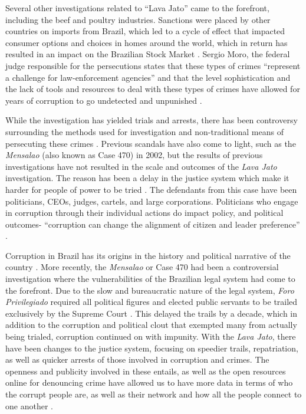 \documentclass[letterpaper, 11pt]{article}
\begin{document}
Several other investigations related to “Lava Jato” came to the forefront, including the beef and poultry industries. Sanctions were placed by other countries on imports from Brazil, which led to a cycle of effect that impacted consumer options and choices in homes around the world, which in return has resulted in an impact on the Brazilian Stock Market \citep{correa2018}. Sergio Moro, the federal judge responsible for the persecutions states that these types of crimes “represent a challenge for law-enforcement agencies” and that the level sophistication and the lack of tools and resources to deal with these types of crimes have allowed for years of corruption to go undetected and unpunished \citep{moro2018}.

While the investigation has yielded trials and arrests, there has been controversy surrounding the methods used for investigation and non-traditional means of persecuting these crimes \citep{lopes2016}. Previous scandals have also come to light, such as the \emph{Mensalao} (also known as Case 470) in 2002, but the results of previous investigations have not resulted in the scale and outcomes of the \emph{Lava Jato} investigation. The reason has been a delay in the justice system which make it harder for people of power to be tried \citep{moro2018}.  The defendants from this case have been politicians, CEOs, judges, cartels, and large corporations. Politicians who engage in corruption through their individual actions do impact policy, and political outcomes- “corruption can change the alignment of citizen and leader preference” \citep{besley2006}.

Corruption in Brazil has its origins in the history and political narrative of the country \citep{lopes2016}. More recently, the \emph{Mensalao} or Case 470 had been a controversial investigation where the vulnerabilities of the Brazilian legal system had come to the forefront. Due to the slow and bureaucratic nature of the legal system, \emph{Foro Privilegiado} required all political figures and elected public servants to be trailed exclusively by the Supreme Court \citep{moro2018}. This delayed the trails by a decade, which in addition to the corruption and political clout that exempted many from actually being trialed, corruption continued on with impunity. With the \emph{Lava Jato}, there have been changes to the justice system, focusing on speedier trails, repatriation, as well as quicker arrests of those involved in corruption and crimes. The openness and publicity involved in these entails, as well as the open resources online for denouncing crime have allowed us to have more data in terms of who the corrupt people are, as well as their network and how all the people connect to one another \citep{angelico2017}. 
\end{document}
